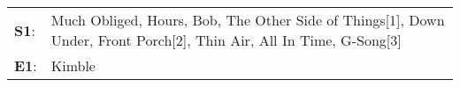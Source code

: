 \begin{supertabular}{p{0.03\textwidth}p{0.92\textwidth}}
 \textbf{S1}:  &  Much Obliged\textsuperscript{}, \enspace Hours\textsuperscript{}, \enspace Bob\textsuperscript{}, \enspace The Other Side of Things[1]\textsuperscript{}, \enspace Down Under\textsuperscript{}, \enspace Front Porch[2]\textsuperscript{}, \enspace Thin Air\textsuperscript{}, \enspace All In Time\textsuperscript{}, \enspace G-Song[3]\textsuperscript{}  \enspace  \\
 \textbf{E1}:  &                                                                                                                                                                                                                                                                                                                                       Kimble\textsuperscript{}  \enspace  \\
\end{supertabular}
